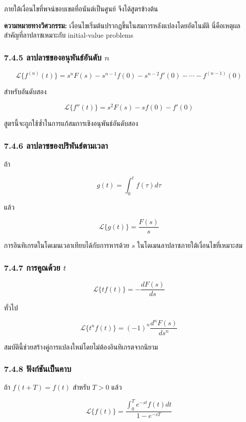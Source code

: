 ภายใต้เงื่อนไขที่พจน์ขอบเขตที่อนันต์เป็นศูนย์ จึงได้สูตรข้างต้น

\textbf{ความหมายทางวิศวกรรม:} เงื่อนไขเริ่มต้นปรากฏขึ้นในสมการหลังแปลงโดยอัตโนมัติ นี่คือเหตุผลสำคัญที่ลาปลาซเหมาะกับ initial-value problems

\subsubsection{\texorpdfstring{7.4.5 ลาปลาซของอนุพันธ์อันดับ $n$}{7.4.5 ลาปลาซของอนุพันธ์อันดับ n}}

\[
\boxed{\mathcal{L}\{f^{(n)}(t)\} =s^nF(s)-s^{n-1}f(0)-s^{n-2}f'(0)-\cdots-f^{(n-1)}(0)}
\]

สำหรับอันดับสอง

\[
\mathcal{L}\{f''(t)\}=s^2F(s)-sf(0)-f'(0)
\]

สูตรนี้จะถูกใช้ซ้ำในการแก้สมการเชิงอนุพันธ์อันดับสอง

\subsubsection{7.4.6 ลาปลาซของปริพันธ์ตามเวลา}

ถ้า

\[
g(t)=\int_0^t f(\tau)d\tau
\]

แล้ว

\[
\boxed{\mathcal{L}\{g(t)\}=\frac{F(s)}{s}}
\]

การอินทิเกรตในโดเมนเวลาเทียบได้กับการหารด้วย $s$ ในโดเมนลาปลาซภายใต้เงื่อนไขที่เหมาะสม

\subsubsection{\texorpdfstring{7.4.7 การคูณด้วย $t$}{7.4.7 การคูณด้วย t}}

\[
\boxed{\mathcal{L}\{t f(t)\}=-\frac{dF(s)}{ds}}
\]

ทั่วไป

\[
\boxed{\mathcal{L}\{t^n f(t)\}=(-1)^n\frac{d^nF(s)}{ds^n}}
\]

สมบัตินี้ช่วยสร้างคู่การแปลงใหม่โดยไม่ต้องอินทิเกรตจากนิยาม

\subsubsection{7.4.8 ฟังก์ชันเป็นคาบ}

ถ้า $f(t+T)=f(t)$ สำหรับ $T>0$ แล้ว

\[
\boxed{\mathcal{L}\{f(t)\} =\frac{\displaystyle\int_0^T e^{-st}f(t)dt}{1-e^{-sT}}}
\]

